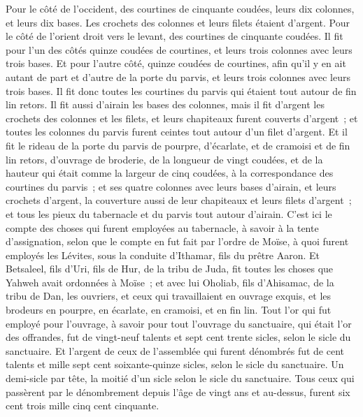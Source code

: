 \begin{multicols}{2}
Pour le côté de l'occident, des courtines de cinquante coudées, leurs dix colonnes, et leurs dix bases. Les crochets des colonnes et leurs filets étaient d'argent.
Pour le côté de l'orient droit vers le levant, des courtines de cinquante coudées.
Il fit pour l'un des côtés quinze coudées de courtines, et leurs trois colonnes avec leurs trois bases.
Et pour l'autre côté, quinze coudées de courtines, afin qu'il y en ait autant de part et d'autre de la porte du parvis, et leurs trois colonnes avec leurs trois bases.
Il fit donc toutes les courtines du parvis qui étaient tout autour de fin lin retors.
Il fit aussi d'airain les bases des colonnes, mais il fit d'argent les crochets des colonnes et les filets, et leurs chapiteaux furent couverts d'argent~; et toutes les colonnes du parvis furent ceintes tout autour d'un filet d'argent.
 Et il fit le rideau de la porte du parvis de pourpre, d'écarlate, et de cramoisi et de fin lin retors, d'ouvrage de broderie, de la longueur de vingt coudées, et de la hauteur qui était comme la largeur de cinq coudées, à la correspondance des courtines du parvis~;
et ses quatre colonnes avec leurs bases d'airain, et leurs crochets d'argent, la couverture aussi de leur chapiteaux et leurs filets d'argent~; 
 et tous les pieux du tabernacle et du parvis tout autour d'airain.
C'est ici le compte des choses qui furent employées au tabernacle, à savoir à la tente d'assignation, selon que le compte en fut fait par l'ordre de Moïse, à quoi furent employés les Lévites, sous la conduite d'Ithamar, fils du prêtre Aaron.
Et Betsaleel, fils d'Uri, fils de Hur, de la tribu de Juda, fit toutes les choses que Yahweh avait ordonnées à Moïse~;
et avec lui Oholiab, fils d'Ahisamac, de la tribu de Dan, les ouvriers, et ceux qui travaillaient en ouvrage exquis, et les brodeurs en pourpre, en écarlate, en cramoisi, et en fin lin.
Tout l'or qui fut employé pour l'ouvrage, à savoir pour tout l'ouvrage du sanctuaire, qui était l'or des offrandes, fut de vingt-neuf talents et sept cent trente sicles, selon le sicle du sanctuaire.
 Et l'argent de ceux de l'assemblée qui furent dénombrés fut de cent talents et mille sept cent soixante-quinze sicles, selon le sicle du sanctuaire.
Un demi-sicle par tête, la moitié d'un sicle selon le sicle du sanctuaire. Tous ceux qui passèrent par le dénombrement depuis l'âge de vingt ans et au-dessus, furent six cent trois mille cinq cent cinquante.

\end{multicols}
